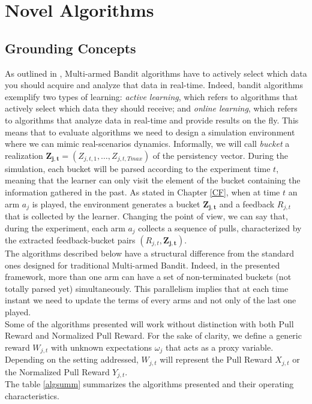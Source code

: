 \chapter{Novel Algorithms}\label{C10}



\section{Grounding Concepts}

As outlined in \cite{banditalgowebopt}, Multi-armed Bandit algorithms have to actively select which data you should acquire and analyze that data in real-time. Indeed, bandit algorithms exemplify two types of learning: \emph{active learning}, which refers to algorithms that actively select which data they should receive; and \emph{online learning}, which refers to algorithms that analyze data in real-time and provide results on the fly. This means that to evaluate algorithms we need to design a simulation environment where we can mimic real-scenarios dynamics. Informally, we will call \emph{bucket} a realization $\boldsymbol{Z_{j,t}}= (Z_{j,t,1},\dots, Z_{j,t,Tmax})$ of the persistency vector. During the simulation, each bucket will be parsed according to the experiment time $t$, meaning that the learner can only visit the element of the bucket containing the information gathered in the past. As stated in Chapter \ref{CF}, when at time $t$ an arm $a_j$ is played, the environment generates a bucket $\boldsymbol{Z_{j,t}}$ and a feedback $R_{j,t}$ that is collected by the learner.
Changing the point of view, we can say that, during the experiment, each arm $a_j$ collects a sequence of pulls, characterized by the extracted feedback-bucket pairs $(R_ {j, t}, \boldsymbol{Z_ {j, t}})$. 
\\The algorithms described below have a structural difference from the standard ones designed for traditional Multi-armed Bandit. Indeed, in the presented framework, more than one arm can have a set of non-terminated buckets (not totally parsed yet) simultaneously.  This parallelism implies that at each time instant we need to update the terms of every arms and not only of the last one played. \\Some of the algorithms presented will work without distinction with both Pull Reward and Normalized Pull Reward.  For the sake of clarity, we define a generic reward $W_{j,t}$ with unknown expectations $\omega_j$ that acts as a proxy variable. Depending on the setting addressed, $W_{j,t}$ will represent the Pull Reward $X_{j,t}$ or the Normalized Pull Reward $Y_{j,t}$.\\ The table \ref{algsumm} summarizes the algorithms presented and their operating characteristics.

